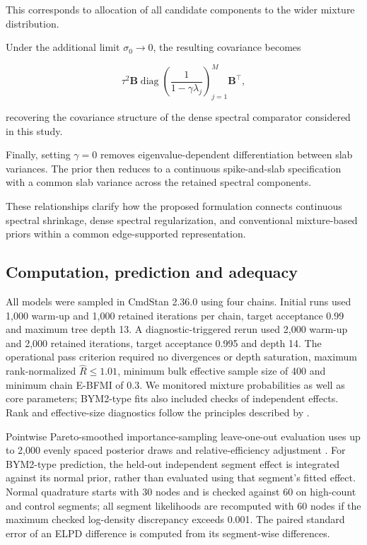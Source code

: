\documentclass[11pt]{article}
\begin{document}
This corresponds to allocation of all candidate components 
to the wider mixture distribution.

Under the additional limit $\sigma_0\rightarrow 0$, the 
resulting covariance becomes

\begin{equation}
	\tau^2\mathbf{B}
	\operatorname{diag}\left(
	\frac{1}{1-\gamma\lambda_j}
	\right)_{j=1}^{M}
	\mathbf{B}^{\top},
\end{equation}

recovering the covariance structure of the dense spectral 
comparator considered in this study.

Finally, setting $\gamma=0$ removes eigenvalue-dependent 
differentiation between slab variances. The prior then reduces 
to a continuous spike-and-slab specification with a common 
slab variance across the retained spectral components.

These relationships clarify how the proposed formulation 
connects continuous spectral shrinkage, dense spectral 
regularization, and conventional mixture-based priors 
within a common edge-supported representation.


\subsection{Computation, prediction and adequacy}
All models were sampled in CmdStan 2.36.0 using four chains. Initial runs used 1,000 warm-up and 1,000 retained iterations per chain, target acceptance 0.99 and maximum tree depth 13. A diagnostic-triggered rerun used 2,000 warm-up and 2,000 retained iterations, target acceptance 0.995 and depth 14. The operational pass criterion required no divergences or depth saturation, maximum rank-normalized $\widehat R\leq1.01$, minimum bulk effective sample size of 400 and minimum chain E-BFMI of 0.3. We monitored mixture probabilities as well as core parameters; BYM2-type fits also included checks of independent effects. Rank and effective-size diagnostics follow the principles described by \citet{vehtari2021}.

Pointwise Pareto-smoothed importance-sampling leave-one-out evaluation uses up to 2,000 evenly spaced posterior draws and relative-efficiency adjustment \citep{vehtari2017}. For BYM2-type prediction, the held-out independent segment effect is integrated against its normal prior, rather than evaluated using that segment's fitted effect. Normal quadrature starts with 30 nodes and is checked against 60 on high-count and control segments; all segment likelihoods are recomputed with 60 nodes if the maximum checked log-density discrepancy exceeds 0.001. The paired standard error of an ELPD difference is computed from its segment-wise differences.
\end{document}
